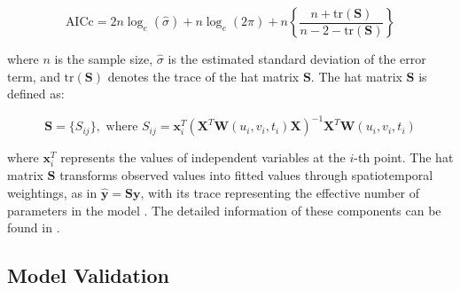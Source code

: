 \begin{equation}
	\text{AICc} = 2n \log_e (\hat{\sigma}) + n \log_e (2\pi) + n \left\{ \frac{n + \text{tr}(\mathbf{S})}{n - 2 - \text{tr}(\mathbf{S})} \right\}
\label{eq:aicc}
\end{equation}

\noindent where \(n\) is the sample size, \(\hat{\sigma}\) is the estimated standard deviation of the error term, and \(\text{tr}(\mathbf{S})\) denotes the trace of the hat matrix $\mathbf{S}$. The hat matrix $\mathbf{S}$ is defined as:

\begin{equation}
	\mathbf{S} = \{S_{ij}\}, \text{ where } S_{ij} = \mathbf{x}_i^T(\mathbf{X}^T \mathbf{W}(u_i, v_i, t_i) \mathbf{X})^{-1}\mathbf{X}^T \mathbf{W}(u_i, v_i, t_i)
	\label{eq:hat_matrix}
\end{equation}

\noindent  where $\mathbf{x}_i^T$ represents the values of independent variables at the $i$-th point. The hat matrix $\mathbf{S}$ transforms observed values into fitted values through spatiotemporal weightings, as in $\hat{\mathbf{y}} = \mathbf{S}\mathbf{y}$, with its trace representing the effective number of parameters in the model \citet{hat_matrix}. The detailed information of these components can be found in \citet{fotheringham2002geographically}.



\subsection{Model Validation}
\label{subsec:gtwr_validation}


